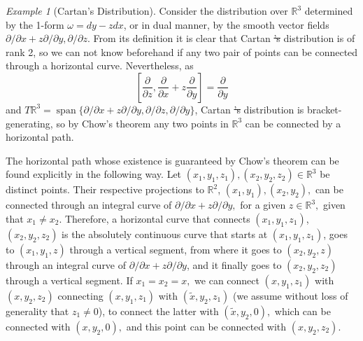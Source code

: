 \documentclass[12pt, letterpaper, reqno]{amsart}
\theoremstyle{definition}
\theoremstyle{plain}
\theoremstyle{remark}
\newtheorem{ex}{Example}
\providecommand{\DIFadd}[1]{{\protect\color{blue}\uwave{#1}}} %
\providecommand{\DIFdel}[1]{{\protect\color{red}\sout{#1}}}                      %
\providecommand{\DIFaddbegin}{} %
\providecommand{\DIFaddend}{} %
\providecommand{\DIFdelbegin}{} %
\providecommand{\DIFdelend}{} %
\newcommand{\DIFscaledelfig}{0.5}
\newlength{\DIFdelgraphicswidth} %
\newlength{\DIFdelgraphicsheight} %
\newcommand{\DIFaddincludegraphics}[2][]{{\color{blue}\fbox{\DIFOincludegraphics[#1]{#2}}}} %
\newcommand{\DIFdelincludegraphics}[2][]{%
\sbox{\DIFdelgraphicsbox}{\DIFOincludegraphics[#1]{#2}}%
\settoboxwidth{\DIFdelgraphicswidth}{\DIFdelgraphicsbox} %
\settoboxtotalheight{\DIFdelgraphicsheight}{\DIFdelgraphicsbox} %
\scalebox{\DIFscaledelfig}{%
\parbox[b]{\DIFdelgraphicswidth}{\usebox{\DIFdelgraphicsbox}\\[-\baselineskip] \rule{\DIFdelgraphicswidth}{0em}}\llap{\resizebox{\DIFdelgraphicswidth}{\DIFdelgraphicsheight}{%
\setlength{\unitlength}{\DIFdelgraphicswidth}%
\begin{picture}(1,1)%
\thicklines\linethickness{2pt} %
{\color[rgb]{1,0,0}\put(0,0){\framebox(1,1){}}}%
{\color[rgb]{1,0,0}\put(0,0){\line( 1,1){1}}}%
{\color[rgb]{1,0,0}\put(0,1){\line(1,-1){1}}}%
\end{picture}%
}\hspace*{3pt}}} %
} %
\DeclareRobustCommand{\DIFaddbegin}{\DIFOaddbegin \let\includegraphics\DIFaddincludegraphics} %
\DeclareRobustCommand{\DIFaddend}{\DIFOaddend \let\includegraphics\DIFOincludegraphics} %
\DeclareRobustCommand{\DIFdelbegin}{\DIFOdelbegin \let\includegraphics\DIFdelincludegraphics} %
\DeclareRobustCommand{\DIFdelend}{\DIFOaddend \let\includegraphics\DIFOincludegraphics} %
\begin{document}
\begin{ex}[Cartan's Distribution]\label{ex:cartan_distribution}
	Consider the distribution over $ \mathbb{R}^3 $ determined by the 1-form $\omega =dy- zdx $, or in dual manner, by the smooth vector fields $ \partial /\partial x + z \partial / \partial y, \partial/\partial z. $ From its definition it is clear that \DIFaddbegin \DIFadd{the }\DIFaddend Cartan \DIFdelbegin \DIFdel{'s }\DIFdelend distribution is of rank 2, so we can not know beforehand if any two pair of points can be connected through a horizontal curve. Nevertheless, as 
	$$ \left[ \frac{\partial}{\partial z}, \frac{\partial}{\partial x}+z \frac{\partial}{\partial y}    \right] = \frac{\partial}{\partial y}  $$ 
	and $ T \mathbb{R}^3 = \operatorname{span}\{  \partial/\partial x + z \partial / \partial y, \partial/\partial z, \partial/\partial y\} $, \DIFaddbegin \DIFadd{the }\DIFaddend Cartan \DIFdelbegin \DIFdel{'s }\DIFdelend distribution is bracket-generating, so by Chow's theorem any two points in $ \mathbb{R}^3 $ can be connected by a horizontal path.

	The horizontal path whose existence is guaranteed by Chow's theorem can be found explicitly in the following way. Let $ (x_1,y_1,z_1), (x_2,y_2,z_2)\in \mathbb{R}^3 $ be distinct points. Their respective projections to $ \mathbb{R}^2 $, $(x_1, y_1), (x_2,y_2),$ can be connected through an integral curve of $ \partial/\partial x+ z\partial/\partial y, $ for a given $ z\in \mathbb{R}^3, $ given that $ x_1\neq x_2. $  Therefore, a horizontal curve that connects $  (x_1,y_1,z_1)$, $(x_2,y_2,z_2)$ is the absolutely continuous curve that starts at $ (x_1,y_1,z_1) $, goes to $ (x_1,y_1,z) $ through a vertical segment, from where it goes to $(x_2,y_2,z)  $ through an integral curve of $ \partial/\partial x+ z \partial/\partial y $, and it finally goes to $ (x_2,y_2,z_2) $ through a vertical segment. If $ x_1=x_2=x, $ we can connect $ (x,y_1,z_1) $ with $ (x,y_2,z_2) $ connecting $(x, y_1,z_1)$ with $ (\tilde x, y_2, z_1) $ (we assume without loss of generality that $ z_1\neq 0 $), to connect the latter with $ (\tilde x, y_2, 0), $ which can be connected with $ (x, y_2, 0), $ and this point can be connected with $ (x, y_2,z_2). $     
\end{ex}
\end{document}
